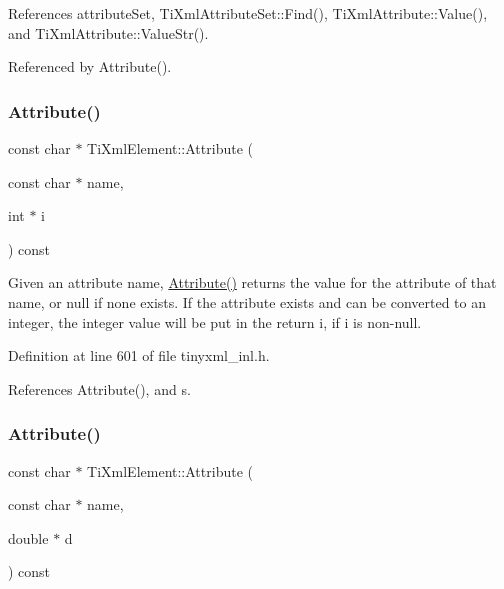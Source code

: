 References attribute\+Set, Ti\+Xml\+Attribute\+Set\+::\+Find(), Ti\+Xml\+Attribute\+::\+Value(), and Ti\+Xml\+Attribute\+::\+Value\+Str().



Referenced by Attribute().

\hypertarget{class_ti_xml_element_a8005d0b808fd02bd1246710cdf95e5f6}{}\label{class_ti_xml_element_a8005d0b808fd02bd1246710cdf95e5f6} 
\subsubsection{\texorpdfstring{Attribute()}{Attribute()}\hspace{0.1cm}{\footnotesize\ttfamily [2/6]}}
{\footnotesize\ttfamily const char $\ast$ Ti\+Xml\+Element\+::\+Attribute (\begin{DoxyParamCaption}\item[{const char $\ast$}]{name,  }\item[{int $\ast$}]{i }\end{DoxyParamCaption}) const}

Given an attribute name, \hyperlink{class_ti_xml_element_a6042f518748f475a7ac4b4e0b509eb05}{Attribute()} returns the value for the attribute of that name, or null if none exists. If the attribute exists and can be converted to an integer, the integer value will be put in the return \textquotesingle{}i\textquotesingle{}, if \textquotesingle{}i\textquotesingle{} is non-\/null. 

Definition at line 601 of file tinyxml\+\_\+inl.\+h.



References Attribute(), and s.

\hypertarget{class_ti_xml_element_a09df893402d0ab1402c8725e6d30ec04}{}\label{class_ti_xml_element_a09df893402d0ab1402c8725e6d30ec04} 
\subsubsection{\texorpdfstring{Attribute()}{Attribute()}\hspace{0.1cm}{\footnotesize\ttfamily [3/6]}}
{\footnotesize\ttfamily const char $\ast$ Ti\+Xml\+Element\+::\+Attribute (\begin{DoxyParamCaption}\item[{const char $\ast$}]{name,  }\item[{double $\ast$}]{d }\end{DoxyParamCaption}) const}

